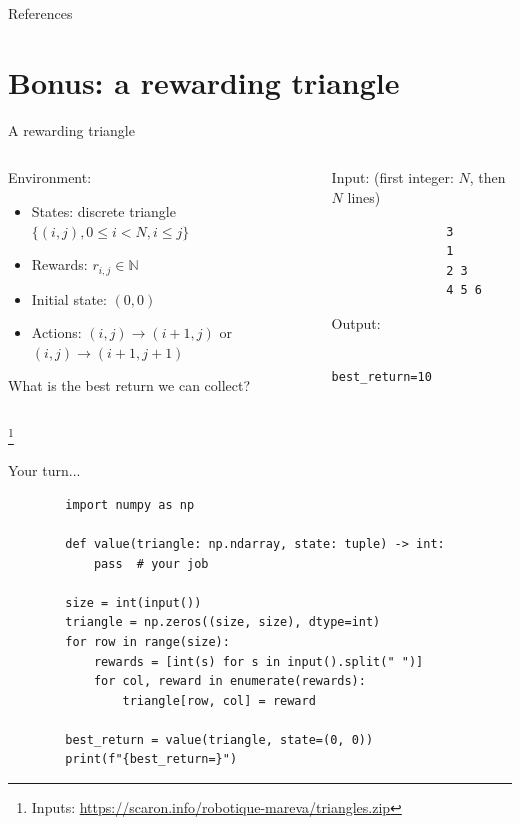 \documentclass[11pt, aspectratio=169]{beamer}
\newcommand\blfootnote[1]{%
  \begingroup
  \renewcommand\thefootnote{}%
  \footnote{#1}%
  \addtocounter{footnote}{-1}%
  \endgroup
}
\begin{document}
\renewcommand*{\bibfont}{\footnotesize}
\begin{frame}[allowframebreaks]{References}
    \printbibliography[heading=none]
\end{frame}

\section*{Bonus: a rewarding triangle}

\begin{frame}[fragile]{A rewarding triangle}
    \begin{columns}
        \begin{column}{0.50\columnwidth}
            Environment:
            \begin{itemize}
                \item States: discrete triangle $\{(i, j), 0 \leq i < N, i \leq j \}$
                \item Rewards: $r_{i, j} \in \mathbb{N}$
                \item Initial state: $(0, 0)$
                \item Actions: $(i, j) \to (i + 1, j)$ or $(i, j) \to (i + 1, j + 1)$
            \end{itemize}
            What is the best return we can collect?
        \end{column}
        \begin{column}{0.50\columnwidth}
            Input: (first integer: $N$, then $N$ lines)
            \begin{verbatim}
                3
                1
                2 3
                4 5 6
            \end{verbatim}
            Output:
            \begin{verbatim}
                best_return=10
            \end{verbatim}
        \end{column}
    \end{columns}
    \blfootnote{
        Inputs: \url{https://scaron.info/robotique-mareva/triangles.zip}
    }
\end{frame}

\begin{frame}[fragile]{Your turn...}
    \begin{verbatim}
        import numpy as np

        def value(triangle: np.ndarray, state: tuple) -> int:
            pass  # your job

        size = int(input())
        triangle = np.zeros((size, size), dtype=int)
        for row in range(size):
            rewards = [int(s) for s in input().split(" ")]
            for col, reward in enumerate(rewards):
                triangle[row, col] = reward

        best_return = value(triangle, state=(0, 0))
        print(f"{best_return=}")
    \end{verbatim}
\end{frame}
\end{document}

